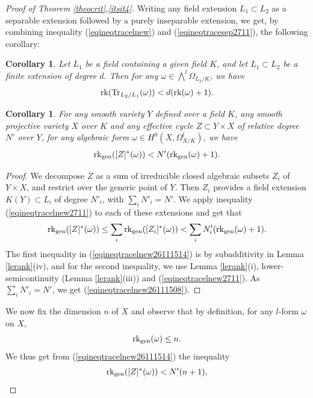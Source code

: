 \documentclass[10pt]{article}
\newtheorem{coro}[theo]{Corollary}
\begin{document}
\begin{proof}[Proof of Theorem \ref{theocrit},\ref{itsit4}]
 Writing any field extension $L_1\subset L_2$ as a separable extension followed by a purely inseparable extension, we get, by combining inequality (\ref{eqineqtracelnew}) and (\ref{eqineqtracesep2711}), the following corollary:
 \begin{coro} \label{corotracetout2711} Let $L_1$  be a field containing a given field  $K$, and let
$L_1\subset L_2$ be a finite   extension of degree $d$. Then for any  $\omega\in\bigwedge^l\Omega_{L_2/K}$, we have
 \begin{eqnarray}\label{eqineqtracelnew2711} {\rm rk}({\rm Tr}_{L_2/L_1}(\omega))< d ({\rm rk}(\omega)+1).
\end{eqnarray}
\end{coro}
\begin{coro} \label{corotraceprime}  For any smooth variety $Y$ defined over a field $K$, any smooth projective variety $X$ over $K$ and any effective cycle
$Z\subset Y\times X$ of relative degree $N'$ over $Y$, for any algebraic form $\omega\in H^0(X,\Omega_{X/K}^l)$, we have
 \begin{eqnarray}\label{eqineqtracelnew26111508} {\rm rk}_{\rm gen}([Z]^*(\omega))< N' ({\rm rk}_{\rm gen}(\omega)+1).
\end{eqnarray}
\end{coro}
\begin{proof} We  decompose $Z$ as a sum of irreducible closed algebraic subsets $Z_i$ of $Y\times X$, and restrict over the generic point of $Y$. Then $Z_i$ provides a field extension $K(Y)\subset L_i$ of degree $N'_i$, with $\sum_i N'_i=N'$. We apply  inequality (\ref{eqineqtracelnew2711}) to each of these extensions and get that
\begin{eqnarray}\label{eqineqtracelnew26111514}{\rm rk}_{\rm gen}([Z]^*(\omega))\leq \sum_i  {\rm rk}_{\rm gen}([Z_i]^*(\omega))<
\sum_iN'_i ({\rm rk}_{\rm gen}(\omega) +1). \end{eqnarray}
The first inequality in (\ref{eqineqtracelnew26111514}) is by subadditivity in Lemma \ref{lerank}(iv), and for the second inequality, we use Lemma \ref{lerank}(i), lower-semicontinuity (Lemma \ref{lerank}(iii)) and (\ref{eqineqtracelnew2711}).
As $\sum_iN'_i= N'$, we get (\ref{eqineqtracelnew26111508}).
\end{proof}
We now fix the dimension $n$ of $X$ and observe that by definition, for any $l$-form $\omega$ on $X$,
$${\rm rk}_{\rm gen}(\omega)\leq n.$$
We thus get from (\ref{eqineqtracelnew26111514}) the inequality
\begin{eqnarray}\label{eqineqtracelnew26111533} {\rm rk}_{\rm gen}([Z]^*(\omega))< N'(n+1),

\end{eqnarray}
\end{proof}
\end{document}
